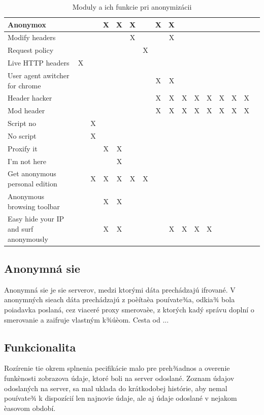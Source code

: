 \begin{table}[!htbp]
\begin{center}
\begin{tabular}{p{4cm}|c|c|c|c|c|c|c|c|c|c|c|c|c|c|c}
Anonymox &  && X & X & X &  & X & X & & & & & & \\  \hline
Modify headers & & &  &  & X &  &  & X &  &  &  & & &  \\  \hline
Request policy & & &  &  & & X  &  &  &  &  &  & & &   \\  \hline
Live HTTP headers & X& &  &  & &  &  &  &  &  &  & & &   \\  \hline
User agent awitcher for chrome & & &  &  & &  & X & X &  &  &  & & &   \\  \hline
Header hacker & & &  &  & &  & X & X & X & X & X & X & X & X    \\  \hline
Mod header & & &  &  & &  & X & X & X & X & X & X & X & X    \\  \hline
Script no & &X &  &  & &  &  &  &  &  &  &  &  &     \\  \hline
No script & &X &  &  & &  &  &  &  &  &  &  &  &     \\  \hline
Proxify it & & &X  & X & &  &  &  &  &  &  &  &  &     \\  \hline
I'm not here & & &  & X & &  &  &  &  &  &  &  &  &     \\  \hline
Get anonymous personal edition & &X &X &X &X&X &  &  &  &  &  &  &  &     \\  \hline
Anonymous browsing toolbar & & & X & X & &  &  &  &  &  &  &  &  &     \\  \hline
Easy hide your IP and surf anonymously & & & X & X& &  &  & X & X & X & X &  &  &     \\  \hline
\end{tabular}
\caption{Moduly a ich funkcie pri anonymizácii}
\label{modulyVlastnosti}
\end{center}
\end{table}

\subsection{Anonymná sie}
\noindent Anonymná sie je sie serverov, medzi ktorými dáta prechádzajú ifrované. V anonymných sieach dáta prechádzajú z poèítaèa pouívate¾a, odkia¾ bola poiadavka poslaná, cez viaceré proxy smerovaèe, z ktorých kadý správu doplní o smerovanie a zaifruje vlastným k¾úèom. Cesta od ...


\subsection{Funkcionalita}
\noindent  Rozírenie tie okrem splnenia pecifikácie malo pre preh¾adnos a overenie funkènosti zobrazova údaje, ktoré boli na server odoslané. Zoznam údajov odoslaných na server, sa mal uklada do krátkodobej histórie, aby nemal pouívate¾ k dispozícií len najnovie údaje, ale aj údaje odoslané v nejakom èasovom období. 

